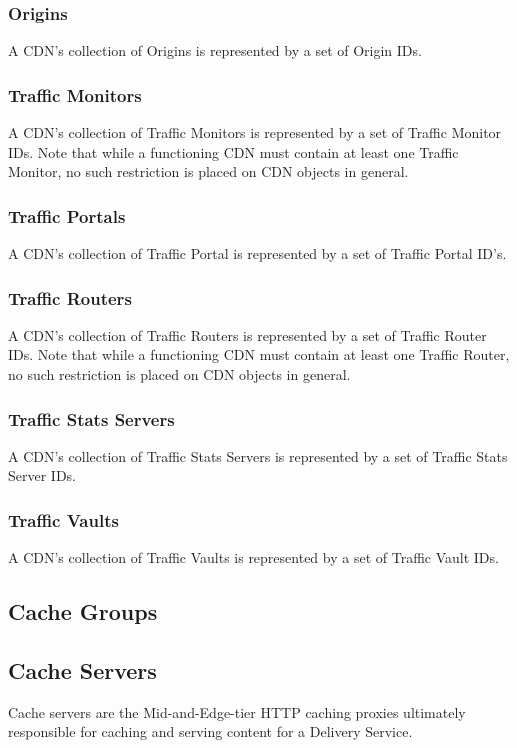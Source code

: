 \subsubsection{Origins}
A CDN's collection of Origins is represented by a set of Origin IDs.

\subsubsection{Traffic Monitors}
A CDN's collection of Traffic Monitors is represented by a set of Traffic
Monitor IDs. Note that while a functioning CDN must contain at least one Traffic
Monitor, no such restriction is placed on CDN objects in general.

\subsubsection{Traffic Portals}
A CDN's collection of Traffic Portal is represented by a set of Traffic Portal
ID's.

\subsubsection{Traffic Routers}
A CDN's collection of Traffic Routers is represented by a set of Traffic Router
IDs. Note that while a functioning CDN must contain at least one Traffic Router,
no such restriction is placed on CDN objects in general.

\subsubsection{Traffic Stats Servers}
A CDN's collection of Traffic Stats Servers is represented by a set of Traffic
Stats Server IDs.

\subsubsection{Traffic Vaults}
A CDN's collection of Traffic Vaults is represented by a set of Traffic Vault
IDs.



\subsection{Cache Groups}



\subsection{Cache Servers}
Cache servers are the Mid-and-Edge-tier HTTP caching proxies ultimately
responsible for caching and serving content for a Delivery Service.

